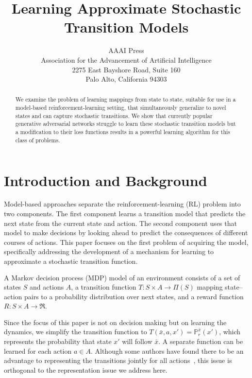\documentclass[letterpaper]{article} %
\begin{document}
%
\title{Learning Approximate Stochastic Transition Models}
\author{AAAI Press\\
Association for the Advancement of Artificial Intelligence\\
2275 East Bayshore Road, Suite 160\\
Palo Alto, California 94303\\
}
\maketitle
\begin{abstract}
We examine the problem of learning mappings from state to state, suitable for use in a model-based reinforcement-learning setting, that simultaneously generalize to novel states and can capture stochastic transitions. We show that currently popular generative adversarial networks struggle to learn these stochastic transition models but a modification to their loss functions results in a powerful learning algorithm for this class of problems.
\end{abstract}

\section{Introduction and Background}

Model-based approaches separate the reinforcement-learning (RL) problem into two components. The first component learns a transition model that predicts the next state from the current state and action. The second component uses that model to make decisions by looking ahead to predict the consequences of different courses of actions. This paper focuses on the first problem of acquiring the model, specifically addressing the development of a mechanism for learning to approximate a stochastic transition function.


A Markov decision process (MDP) model of an environment consists of a set of states $S$ and actions $A$, a transition function $T:S\times A \rightarrow \Pi(S)$ mapping state--action pairs to a probability distribution over next states, and a reward function $R:S\times A \rightarrow \Re$.

Since the focus of this paper is not on decision making but on learning the dynamics, we simplify the transition function to $T(\bar{x},a,x')=\mathbb{P}^{\bar{x}}_{r}(x')$, which represents the probability that state $x'$ will follow $\bar{x}$. A separate function can be learned for each action $a\in A$. Although some authors have found there to be an advantage to representing the transitions jointly for all actions~\cite{oh15}, this issue is orthogonal to the representation issue we address here.
\end{document}
